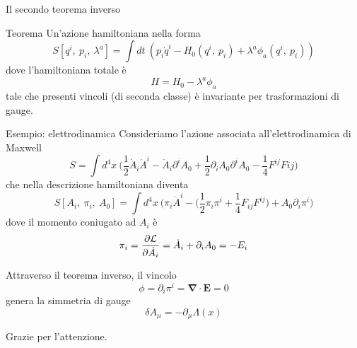 \begin{frame}{Il secondo teorema inverso}
    \begin{block}{Teorema}
        Un'azione hamiltoniana nella forma
    \begin{equation*} 
        S[q^i,~p_i,~\lambda^a] = \int dt ~ (p_i \dot q^i - H_0(q^i, ~p_i) + \lambda^a \phi_a (q^i, ~p_i))
    \end{equation*} 
        dove l'hamiltoniana totale è 
    \begin{equation*}
        H = H_0 - \lambda^a \phi_a
    \end{equation*} 
        tale che presenti vincoli (di seconda classe) è invariante per trasformazioni di gauge.
    \end{block}
\end{frame}

\begin{frame} {Esempio: elettrodinamica}
    Consideriamo l'azione associata all'elettrodinamica di Maxwell
    \begin{equation*}
        S = \int d^4 x ~ \Big (\frac{1}{2} \dot A_i \dot A^i - \dot A_i \partial^i A_0 + \frac{1}{2} \partial_i A_0 \partial^i A_0 - \frac{1}{4} F^{ij} F{ij} \Big )
    \end{equation*}
    che nella descrizione hamiltoniana diventa
    \begin{equation*}
        S[A_i, ~\pi_i, ~A_0] = \int d^4 x ~ \Big ( \pi_i \dot A^i - \Big ( \frac{1}{2} \pi_i \pi^i + \frac{1}{4} F_{ij} F^{ij} \Big) + A_0 \partial_i \pi^i \Big)
    \end{equation*}
    dove il momento coniugato ad $A_i$ è 
    \begin{equation*}
        \pi_i = \frac{\partial\mathcal L}{\partial\dot A_i} = \dot A_i + \partial_i A_0 = - E_i
    \end{equation*}
\end{frame}

\begin{frame}
    Attraverso il teorema inverso, il vincolo
    \begin{equation*}
        \phi = \partial_i \pi^i = \boldsymbol \nabla \cdot \mathbf E = 0
    \end{equation*}
    genera la simmetria di gauge
    \begin{equation*}
        \delta A_\mu = - \partial_\mu \Lambda(x)
    \end{equation*}
\end{frame}

\begin{frame}
   \begin{center}
        Grazie per l'attenzione.
   \end{center} 
\end{frame}

